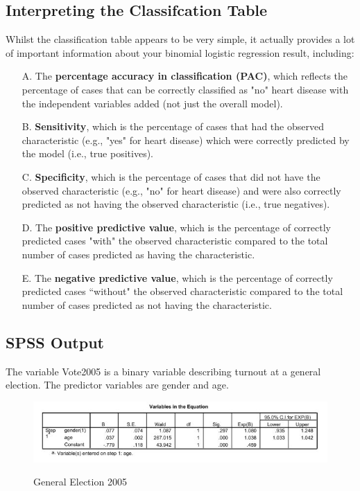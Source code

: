 \documentclass[a4paper,12pt]{article}
\begin{document}
\subsection{Interpreting the Classifcation Table}
Whilst the classification table appears to be very simple, it actually provides a lot of important information about your binomial logistic regression result, including:


\begin{itemize}
	\item[A.] The \textbf{percentage accuracy in classification (PAC)}, which reflects the percentage of cases that can be correctly classified as "no" heart disease with the independent variables added (not just the overall model).
	\item[B.] \textbf{Sensitivity}, which is the percentage of cases that had the observed characteristic (e.g., "yes" for heart disease) which were correctly predicted by the model (i.e., true positives).
	\item[C.] \textbf{Specificity}, which is the percentage of cases that did not have the observed characteristic (e.g., "no" for heart disease) and were also correctly predicted as not having the observed characteristic (i.e., true negatives).
	\item[D.] The \textbf{positive predictive value}, which is the percentage of correctly predicted cases "with" the observed characteristic compared to the total number of cases predicted as having the characteristic.
	\item[E.] The \textbf{negative predictive value}, which is the percentage of correctly predicted cases ``without" the observed characteristic compared to the total number of cases predicted as not having the characteristic.
\end{itemize}




	
\subsection{SPSS Output}
The variable Vote2005 is a binary variable describing turnout at a general election. The predictor variables are gender and age.
\begin{center}
	\begin{figure}[h!]
		\includegraphics[scale=0.6]{images/LogWeek10B.jpg}\\
		\caption{General Election 2005}
	\end{figure}
\end{center}
\end{document}
